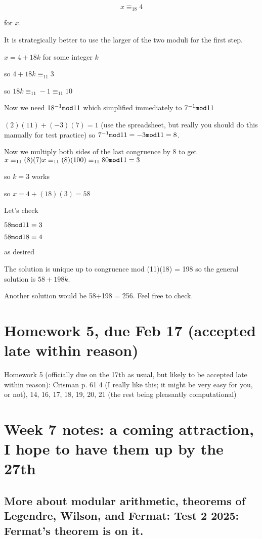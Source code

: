 \documentclass[12pt]{article}
\begin{document}
$$x \equiv_{18} 4$$

for $x$.

It is strategically better to use the larger of the two moduli for the first step.

$x=4+18k$ for some integer $k$

so $4+18k \equiv_{11} 3$

so $18k \equiv_{11} -1 \equiv_{11} 10$

Now we need $18^{-1}{\tt mod}11$ which simplified immediately to $7^{-1}{\tt mod} 11$

$(2)(11)+(-3)(7)=1$ (use the spreadsheet, but really you should do this manually for test practice) so $7^{-1}{\tt mod}11 = -3 {\tt mod}11 = 8$.

Now we multiply both sides of the last congruence by 8 to get $x \equiv_{11} (8)(7)x \equiv_{11} (8)(100) \equiv_{11} 80 {\tt mod} 11 = 3$

so $k=3$ works

so $x = 4+(18)(3) =58$

Let's check

$58 {\tt mod} 11 =3$

$58{\tt mod} 18 = 4$

as desired

The solution is unique up to congruence mod (11)(18) = 198 so the general solution is $58 + 198k$.

Another solution would be 58+198 = 256.  Feel free to check.

\section{Homework 5, due Feb 17 (accepted late within reason)}

Homework 5 (officially due on the 17th as usual, but likely to be accepted late within reason): Crisman p. 61 4 (I really like this; it might be very easy for you, or not), 14, 16, 17, 18, 19, 20, 21 (the rest being pleasantly computational)

\section{Week 7 notes:  a coming attraction, I hope to have them up by the 27th}

\subsection{More about modular arithmetic, theorems of Legendre, Wilson, and Fermat:  {\bf Test 2 2025:}  Fermat's theorem is on it.}
\end{document}
